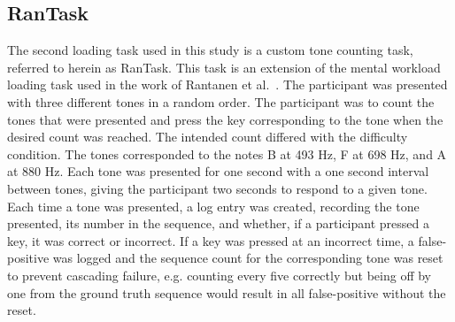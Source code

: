 \documentclass[11pt]{article}
\begin{document}
	\subsection{RanTask}
	The second loading task used in this study is a custom tone counting task, referred to herein as RanTask. This task is an extension of the mental workload loading task used in the work of Rantanen et al.~\cite{Rantanen}. The participant was presented with three different tones in a random order. The participant was to count the tones that were presented and press the key corresponding to the tone when the desired count was reached. The intended count differed with the difficulty condition. The tones corresponded to the notes B at 493 Hz, F at 698 Hz, and A at 880 Hz. Each tone was presented for one second with a one second interval between tones, giving the participant two seconds to respond to a given tone. Each time a tone was presented, a log entry was created, recording the tone presented, its number in the sequence, and whether, if a participant pressed a key, it was correct or incorrect. If a key was pressed at an incorrect time, a false-positive was logged and the sequence count for the corresponding tone was reset to prevent cascading failure, e.g. counting every five correctly but being off by one from the ground truth sequence would result in all false-positive without the reset. 
	
	\begin{table}[]
	\centering
	\caption[RanTask Load Condition Tone Counts]{The RanTask desired counts of each tone for each load condition.}
	\label{tab:rantask-params}
	\end{table}
	
\end{document}
